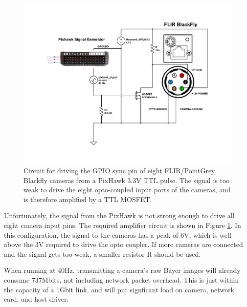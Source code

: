 \begin{figure}[h]
	\centering
	\includegraphics[width=\linewidth]{figures/aviary_sync_circuit.pdf}
        \caption{Circuit for driving the GPIO sync pin of eight FLIR/PointGrey Blackfly
          cameras from a PixHawk 3.3V TTL pulse. The signal is too
          weak to drive the eight opto-coupled input ports of the
          cameras, and is therefore amplified by a TTL MOSFET.}
    \label{fig:sync_circuit}
\end{figure}

Unfortunately, the signal from the PixHawk is not strong enough to
drive all eight camera input pins. The required amplifier circuit is
shown in Figure \ref{fig:sync_circuit}. In this configuration, the
signal to the cameras has a peak of 6V, which is well above the 3V
required to drive the opto coupler. If more 
cameras are connected and the signal gets too weak, a 
smaller resistor R should be used.

When running at 40Hz, transmitting a camera's raw Bayer
images will already consume 737Mbits, not including network packet
overhead. This is just within the capacity of a 1Gbit link, and will
put signficant load on camera, network card, and host driver.
